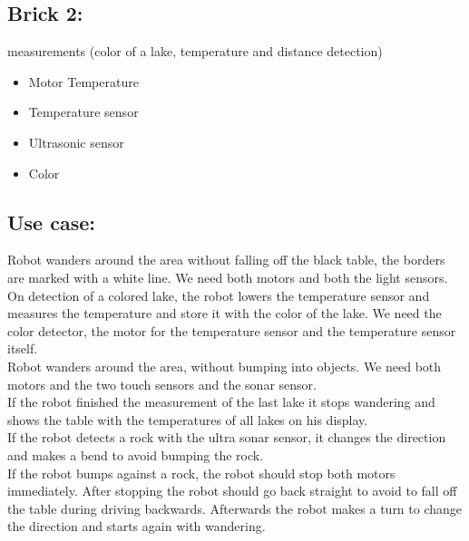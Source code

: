 \documentclass[10pt,a4paper]{article}
\begin{document}
\subsection*{Brick 2:} measurements (color of a lake, temperature and distance detection)
\begin{itemize}
\item[] Motor Temperature
\item[] Temperature sensor
\item[] Ultrasonic sensor
\item[] Color
\end{itemize}


\subsection*{Use case:}

Robot wanders around the area without falling off the black table, the borders are marked with a white line.
We need both motors and both the light sensors.\\

On detection of a colored lake, the robot lowers the temperature sensor and measures the temperature and store it with the color of the lake.
We need the color detector, the motor for the temperature sensor and the temperature sensor itself.\\

Robot wanders around the area, without bumping into objects.
We need both motors and the two touch sensors and the sonar sensor.\\ %

If the robot finished the measurement of the last lake it stops wandering and shows the table with the temperatures of all lakes on his display. \\

If the robot detects a rock with the ultra sonar sensor, it changes the direction and makes a bend to avoid bumping the rock.\\

If the robot bumps against a rock, the robot should stop both motors immediately. After stopping the robot should go back straight to avoid to fall off the table during driving backwards. Afterwards the robot makes a turn to change the direction and starts again with wandering.\\
\end{document}
